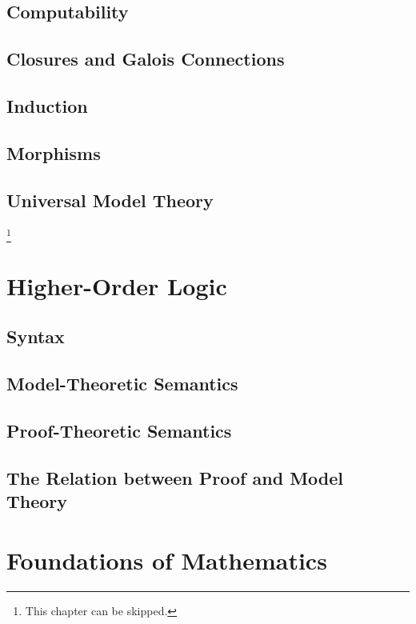 \documentclass{book}
\begin{document}
\chapter{Computability}
  

\chapter{Closures and Galois Connections}
  

\chapter{Induction}
  

\chapter{Morphisms}
  

\chapter{Universal Model Theory}\label{sec:unimod}
\footnote{This chapter can be skipped.}
  

\part{Higher-Order Logic}\label{part:hol}

\chapter{Syntax}
  

\chapter{Model-Theoretic Semantics}
  
  
\chapter{Proof-Theoretic Semantics}
  

\chapter{The Relation between Proof and Model Theory}
  

\part{Foundations of Mathematics}\label{sec:found}
\end{document}
